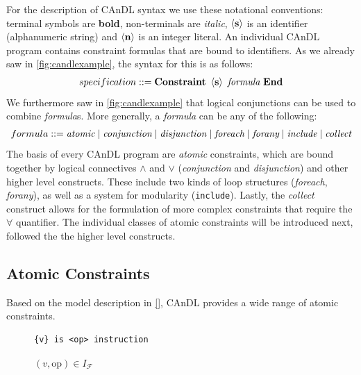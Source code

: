     For the description of CAnDL syntax we use these notational conventions:
    terminal symbols are {\bf bold}, non-terminals are {\it italic},
    $\left<\text{\bf s}\right>$ is an identifier (alphanumeric string) and
    $\left<\text{\bf n}\right>$ is an integer literal.
    An individual CAnDL program contains constraint formulas that are
    bound to identifiers.
    As we already saw in \autoref{fig:candlexample}, the syntax for this is as
    follows:
    \begin{align*}
        specification ::= \text{\bf Constraint}\ \left<\text{\bf s}\right>\ \text{\it formula}\ \text{\bf End}
    \end{align*}
    We furthermore saw in \autoref{fig:candlexample} that logical conjunctions
    can be used to combine {\it formula}s.
    More generally, a {\it formula} can be any of the following:
    \begin{align*}
        formula ::= \text{\it atomic}\mid\text{\it conjunction}\mid\text{\it disjunction}\mid\text{\it foreach}\mid \text{\it forany}\mid\text{\it include}\mid\text{\it collect}
    \end{align*}
    The basis of every CAnDL program are {\it atomic} constraints, which are
    bound together by logical connectives $\land$ and $\lor$
    ({\it conjunction} and {\it disjunction}) and other higher level constructs.
    These include two kinds of loop structures ({\it foreach}, {\it forany}), as
    well as a system for modularity (\texttt{include}).
    Lastly, the {\it collect} construct allows for the formulation of more
    complex constraints that require the $\forall$ quantifier.
    The individual classes of atomic constraints will be introduced next,
    followed the the higher level constructs.

\subsection{Atomic Constraints}

    Based on the model description in \autoref{}, CAnDL provides a wide range of
    atomic constraints.

    \begin{figure}[h]
    \begin{minipage}{0.49\textwidth}
\begin{lstlisting}[language=CAnDL]
{v} is <op> instruction
\end{lstlisting}
    \end{minipage}
    \begin{minipage}{0.49\textwidth}
    $(v,\text{op})\in I_\mathcal F$
    \end{minipage}
    \end{figure}

